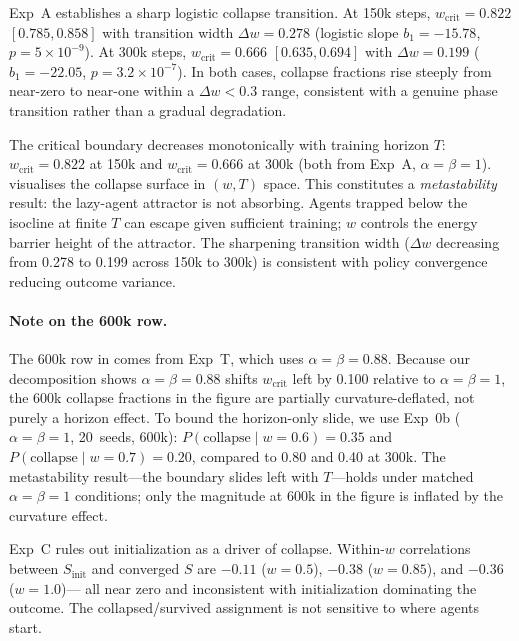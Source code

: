 \documentclass[11pt]{article}
\newcommand{\wcrit}{w_{\mathrm{crit}}}
\begin{document}
Exp~A establishes a sharp logistic collapse transition.
At 150k steps, $\wcrit = 0.822$ $[0.785, 0.858]$ with transition width
$\Delta w = 0.278$ (logistic slope $b_1 = -15.78$, $p = 5 \times 10^{-9}$).
At 300k steps, $\wcrit = 0.666$ $[0.635, 0.694]$ with $\Delta w = 0.199$
($b_1 = -22.05$, $p = 3.2 \times 10^{-7}$).
In both cases, collapse fractions rise steeply from near-zero to near-one
within a $\Delta w < 0.3$ range, consistent with a genuine phase
transition rather than a gradual degradation.

The critical boundary decreases monotonically with training horizon $T$:
$\wcrit = 0.822$ at 150k and $\wcrit = 0.666$ at 300k (both from Exp~A,
$\alpha{=}\beta{=}1$).
 visualises the collapse surface in $(w, T)$ space.
This constitutes a \emph{metastability} result: the lazy-agent attractor
is not absorbing.
Agents trapped below the isocline at finite $T$ can escape given
sufficient training; $w$ controls the energy barrier height of the
attractor.
The sharpening transition width ($\Delta w$ decreasing from 0.278 to
0.199 across 150k to 300k) is consistent with policy convergence reducing
outcome variance.

\paragraph{Note on the 600k row.}
The 600k row in  comes from Exp~T, which uses
$\alpha{=}\beta{=}0.88$.
Because our decomposition shows $\alpha{=}\beta{=}0.88$ shifts
$\wcrit$ left by 0.100 relative to $\alpha{=}\beta{=}1$, the 600k
collapse fractions in the figure are partially curvature-deflated, not
purely a horizon effect.
To bound the horizon-only slide, we use Exp~0b ($\alpha{=}\beta{=}1$,
20~seeds, 600k): $P(\mathrm{collapse}\mid w{=}0.6) = 0.35$ and
$P(\mathrm{collapse}\mid w{=}0.7) = 0.20$, compared to 0.80 and 0.40
at 300k.
The metastability result---the boundary slides left with $T$---holds
under matched $\alpha{=}\beta{=}1$ conditions; only the magnitude at
600k in the figure is inflated by the curvature effect.

Exp~C rules out initialization as a driver of collapse.
Within-$w$ correlations between $S_{\mathrm{init}}$ and converged $S$
are $-0.11$ ($w{=}0.5$), $-0.38$ ($w{=}0.85$), and $-0.36$ ($w{=}1.0$)---
all near zero and inconsistent with initialization dominating the outcome.
The collapsed/survived assignment is not sensitive to where agents start.
\end{document}

